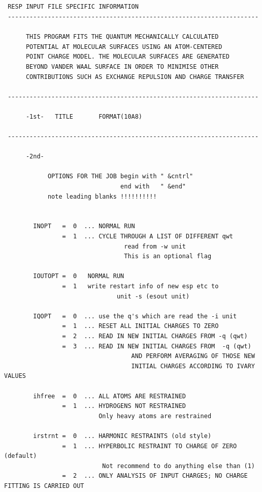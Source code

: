 \documentclass[a4paper]{article}
\begin{document}
\begin{tcolorbox}
\begin{verbatim}




 RESP INPUT FILE SPECIFIC INFORMATION
 ---------------------------------------------------------------------
 
      THIS PROGRAM FITS THE QUANTUM MECHANICALLY CALCULATED
      POTENTIAL AT MOLECULAR SURFACES USING AN ATOM-CENTERED
      POINT CHARGE MODEL. THE MOLECULAR SURFACES ARE GENERATED
      BEYOND VANDER WAAL SURFACE IN ORDER TO MINIMISE OTHER
      CONTRIBUTIONS SUCH AS EXCHANGE REPULSION AND CHARGE TRANSFER
 
 ---------------------------------------------------------------------
 
      -1st-   TITLE       FORMAT(10A8)
 
 ---------------------------------------------------------------------
 
      -2nd-
 
            OPTIONS FOR THE JOB begin with " &cntrl"
                                end with   " &end"
            note leading blanks !!!!!!!!!!
 
 
        INOPT   =  0  ... NORMAL RUN
                =  1  ... CYCLE THROUGH A LIST OF DIFFERENT qwt
                                 read from -w unit 
                                 This is an optional flag
 
        IOUTOPT =  0   NORMAL RUN
                =  1   write restart info of new esp etc to 
                               unit -s (esout unit)  
 
        IQOPT   =  0  ... use the q's which are read the -i unit 
                =  1  ... RESET ALL INITIAL CHARGES TO ZERO
                =  2  ... READ IN NEW INITIAL CHARGES FROM -q (qwt) 
                =  3  ... READ IN NEW INITIAL CHARGES FROM  -q (qwt)
                                   AND PERFORM AVERAGING OF THOSE NEW 
                                   INITIAL CHARGES ACCORDING TO IVARY VALUES
 
        ihfree  =  0  ... ALL ATOMS ARE RESTRAINED
                =  1  ... HYDROGENS NOT RESTRAINED
                          Only heavy atoms are restrained
 
        irstrnt =  0  ... HARMONIC RESTRAINTS (old style)
                =  1  ... HYPERBOLIC RESTRAINT TO CHARGE OF ZERO (default)
                           Not recommend to do anything else than (1)
                =  2  ... ONLY ANALYSIS OF INPUT CHARGES; NO CHARGE FITTING IS CARRIED OUT
 

\end{verbatim}
\end{tcolorbox}
\end{document}
